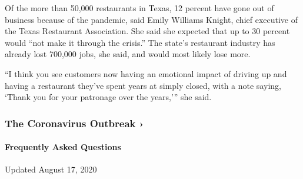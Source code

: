 Of the more than 50,000 restaurants in Texas, 12 percent have gone out
of business because of the pandemic, said Emily Williams Knight, chief
executive of the Texas Restaurant Association. She said she expected
that up to 30 percent would ``not make it through the crisis.'' The
state's restaurant industry has already lost 700,000 jobs, she said, and
would most likely lose more.

``I think you see customers now having an emotional impact of driving up
and having a restaurant they've spent years at simply closed, with a
note saying, `Thank you for your patronage over the years,''' she said.

\href{https://www.nytimes3xbfgragh.onion/news-event/coronavirus?action=click\&pgtype=Article\&state=default\&region=MAIN_CONTENT_3\&context=storylines_faq}{}

\hypertarget{the-coronavirus-outbreak-}{%
\subsubsection{The Coronavirus Outbreak
›}\label{the-coronavirus-outbreak-}}

\hypertarget{frequently-asked-questions}{%
\paragraph{Frequently Asked
Questions}\label{frequently-asked-questions}}

Updated August 17, 2020


